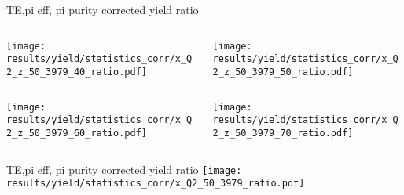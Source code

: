 \begin{frame}{TE,pi eff, pi purity corrected yield ratio}
\begin{columns}
\begin{column}[T]{0.5\textwidth}
\texttt{[image: results/yield/statistics\_corr/x\_Q2\_z\_50\_3979\_40\_ratio.pdf]}
\end{column}
\begin{column}[T]{0.5\textwidth}
\texttt{[image: results/yield/statistics\_corr/x\_Q2\_z\_50\_3979\_50\_ratio.pdf]}
\end{column}
\end{columns}
\begin{columns}
\begin{column}[T]{0.5\textwidth}
\texttt{[image: results/yield/statistics\_corr/x\_Q2\_z\_50\_3979\_60\_ratio.pdf]}
\end{column}
\begin{column}[T]{0.5\textwidth}
\texttt{[image: results/yield/statistics\_corr/x\_Q2\_z\_50\_3979\_70\_ratio.pdf]}
\end{column}
\end{columns}
\end{frame}
\begin{frame}{TE,pi eff, pi purity corrected yield ratio}
\texttt{[image: results/yield/statistics\_corr/x\_Q2\_50\_3979\_ratio.pdf]}
\end{frame}
